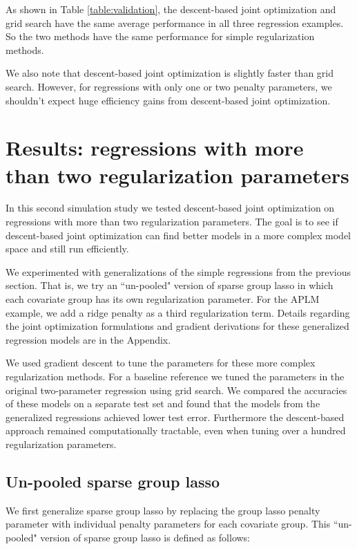 \documentclass[12pt,letterpaper]{article}
\begin{document}
As shown in Table \ref{table:validation}, the descent-based joint optimization and grid search have the same average performance in all three regression examples. So the two methods have the same performance for simple regularization methods.

We also note that descent-based joint optimization is slightly faster than grid search. However, for regressions with only one or two penalty parameters, we shouldn't expect huge efficiency gains from descent-based joint optimization.

\section{Results: regressions with more than two regularization parameters}\label{results2}

In this second simulation study we tested descent-based joint optimization on regressions with more than two regularization parameters. The goal is to see if descent-based joint optimization can find better models in a more complex model space and still run efficiently.

We experimented with generalizations of the simple regressions from the previous section. That is, we try an ``un-pooled" version of sparse group lasso in which each covariate group has its own regularization parameter. For the APLM example, we add a ridge penalty as a third regularization term. Details regarding the joint optimization formulations and gradient derivations for these generalized regression models are in the Appendix.

We used gradient descent to tune the parameters for these more complex regularization methods. For a baseline reference we tuned the parameters in the original two-parameter regression using grid search. We compared the accuracies of these models on a separate test set and found that the models from the generalized regressions achieved lower test error. Furthermore the descent-based approach remained computationally tractable, even when tuning over a hundred regularization parameters.

\subsection{Un-pooled sparse group lasso}

We first generalize sparse group lasso by replacing the group lasso penalty parameter with individual penalty parameters for each covariate group. This ``un-pooled" version of sparse group lasso is defined as follows:
\end{document}

